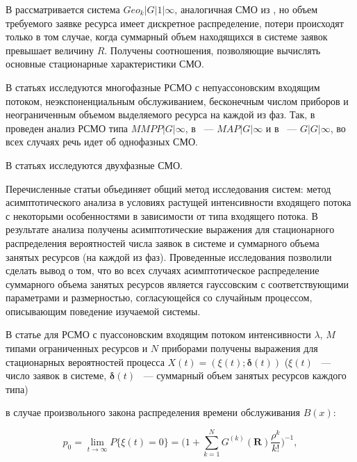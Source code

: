 \documentclass[a4paper,12pt]{article}
\begin{document}
В \cite{Pechinkin_29_2012} рассматривается система $Geo_k|G|1|\infty$, аналогичная СМО из \cite{Pechinkin_28_2011}, но объем требуемого заявке ресурса имеет дискретное распределение, потери происходят только в том случае, когда суммарный объем находящихся в системе заявок превышает величину $R$. Получены соотношения, позволяющие вычислять основные стационарные характеристики СМО.



В статьях \cite{Mois_1_2017,Mois_2_2017,Mois_3_2016,Mois_4_2017,Mois_5_2017} исследуются многофазные РСМО с непуассоновским входящим потоком, неэкспоненциальным обслуживанием, бесконечным числом приборов и неограниченным объемом выделяемого ресурса на каждой из фаз. Так, в \cite{Mois_2_2017} проведен анализ РСМО типа $MMPP|G|\infty$, в \cite{Mois_3_2016} ~--- $MAP|G|\infty$ и в \cite{Mois_1_2017} ~--- $G|G|\infty$, во всех случаях речь идет об однофазных СМО.

В статьях \cite{Mois_4_2017,Mois_5_2017} исследуются двухфазные СМО.

Перечисленные статьи объединяет общий метод исследования систем: метод асимптотического анализа в условиях растущей интенсивности входящего потока с некоторыми особенностями в зависимости от типа входящего потока. В результате анализа получены асимптотические выражения для стационарного распределения вероятностей числа заявок в системе и суммарного объема занятых ресурсов (на каждой из фаз). Проведенные исследования позволили сделать вывод о том, что во всех случаях асимптотическое распределение суммарного объема занятых ресурсов является гауссовским с соответствующими параметрами и размерностью, согласующейся со случайным процессом, описывающим поведение изучаемой системы.



В статье \cite{Naumov_18_2016} для РСМО с пуассоновским входящим потоком интенсивности $\lambda$, $M$ типами ограниченных ресурсов и $N$ приборами получены выражения для стационарных вероятностей процесса $X(t)=(\xi(t);\boldsymbol{\delta}(t))$ ($\xi(t)$ ~--- число заявок в системе, $\boldsymbol{\delta}(t)$ ~--- суммарный объем занятых ресурсов каждого типа)


в случае произвольного закона распределения времени обслуживания $B(x)$:

\begin{equation}

p_0=\lim_{t\rightarrow \infty}P\{\xi(t)=0\}=\bigg(1+\sum_{k=1}^{N}

G^{(k)}(\mathbf{R})\frac{\rho^{k}}{k!} \bigg ) ^{-1},

\end{equation}
\end{document}
